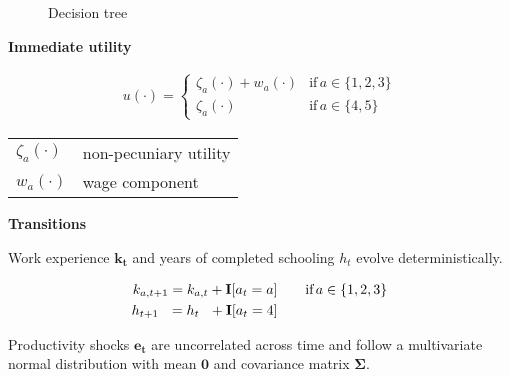 \begin{frame}
\begin{figure}
  \caption{Decision tree}
  \scalebox{0.70}{}
\end{figure}
\end{frame}
\begin{frame}\textbf{Immediate utility}\vspace{0.3cm}

  \begin{align*}
  u(\cdot) =
  \begin{cases}
      \zeta_a(\cdot)  + w_a(\cdot)                & \text{if}\, a \in \{1, 2, 3\}  \\
      \zeta_a(\cdot)                                                  &  \text{if}\, a \in \{4, 5\}
  \end{cases}
  \end{align*}

\begin{table}[]
	\hskip1.5cm
	\begin{tabular}{ll}
	$\zeta_a(\cdot)$	& non-pecuniary utility \\[-0.5em]
	$w_a(\cdot) $	& wage component
	\end{tabular}
\end{table}



\end{frame}
\begin{frame}\textbf{Transitions}\vspace{0.3cm}

  Work experience $\bm{k_t}$  and years of completed schooling $h_t$ evolve deterministically.

  \begin{align*}
  k_{a,t+1} = k_{a,t} + {\textbf{I}}[a_t = a]  &\qquad \text{if}\, a \in \{1, 2, 3\} \\
  h_{t + 1\phantom{,a}} = h_{t\phantom{,a}} +   {\textbf{I}}[a_t = 4]  &\qquad\\
  \end{align*}

  Productivity shocks $\bm{e_t}$ are uncorrelated across time and follow a multivariate normal distribution with mean $\bm{0}$ and covariance matrix $\bm{\Sigma}$.

\end{frame}
